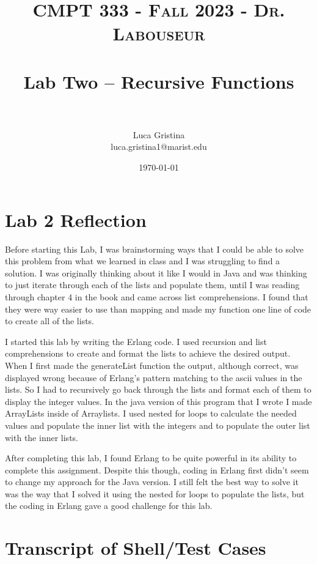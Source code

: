 \documentclass[letterpaper, 10pt]{article}
\title{	
   \normalfont \normalsize 
   \textsc{CMPT 333 - Fall 2023 - Dr. Labouseur} \\[10pt] %
   \horrule{0.5pt} \\[0.25cm] 	%
   \huge Lab Two -- Recursive Functions \\     	    %
   \horrule{0.5pt} \\[0.25cm] 	%
}
\author{Luca Gristina \\ \normalsize luca.gristina1@marist.edu}
\date{\normalsize\today} 	%
\begin{document}
\maketitle %


\setlength{\parindent}{20pt}
\section{Lab 2 Reflection}

Before starting this Lab, I was brainstorming ways that I could be able to solve this problem from what we learned in class and I was struggling to find a solution. I was originally thinking about it like I would in Java and was thinking to just iterate through each of the lists and populate them, until I was reading through chapter 4 in the book and came across list comprehensions. I found that they were way easier to use than mapping and made my function one line of code to create all of the lists. 

I started this lab by writing the Erlang code. I used recursion and list comprehensions to create and format the lists to achieve the desired output. When I first made the generateList function the output, although correct, was displayed wrong because of Erlang's pattern matching to the ascii values in the lists. So I had to recursively go back through the lists and format each of them to display the integer values. In the java version of this program that I wrote I made ArrayLists inside of Arraylists. I used nested for loops to calculate the needed values and populate the inner list with the integers and to populate the outer list with the inner lists. 

After completing this lab, I found Erlang to be quite powerful in its ability to complete this assignment. Despite this though, coding in Erlang first didn't seem to change my approach for the Java version. I still felt the best way to solve it was the way that I solved it using the nested for loops to populate the lists, but the coding in Erlang gave a good challenge for this lab.

\section{Transcript of Shell/Test Cases}
\end{document}
